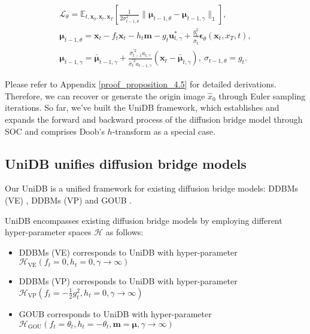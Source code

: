 \begin{equation}\label{objective_function}
\begin{gathered}
\mathcal{L}_{\theta} = \mathbb{E}_{t, \mathbf{x}_0, \mathbf{x}_t, \mathbf{x}_T} \left[ \frac{1}{2\sigma_{t-1, \theta}^2} \big \| \boldsymbol{\mu}_{t-1, \theta} - \boldsymbol{\mu}_{t-1, \gamma} \big \|_1 \right], \\
\boldsymbol{\mu}_{t-1, \theta} = \mathbf{x}_{t} - f_t \mathbf{x}_t - h_t \mathbf{m} - g_t \mathbf{u}_{t, \gamma}^{*} + \frac{g^2_t}{\bar{\sigma}_{t}^{\prime}} \boldsymbol{\epsilon}_{\theta}(\mathbf{x}_t, x_T, t), \\
\boldsymbol{\mu}_{t-1, \gamma} = \bar{\boldsymbol{\mu}}_{t-1, \gamma} + \frac{\bar{\sigma}_{t-1}^{\prime2}a_{t, \gamma}}{\bar{\sigma}_{t}^{\prime2}a_{t-1, \gamma} } (\mathbf{x}_t - \bar{\boldsymbol{\mu}}_{t, \gamma}),\ \sigma_{t-1, \theta} = g_t.
\end{gathered}
\end{equation}

Please refer to Appendix \ref{proof_proposition_4.5} for detailed derivations. Therefore, we can recover or generate the origin image $\hat{x}_0$ through Euler sampling iterations. So far, we've built the UniDB framework, which establishes and expands the forward and backward process of the diffusion bridge model through SOC and comprises Doob's $h$-transform as a special case. 


\subsection{UniDB unifies diffusion bridge models}
Our UniDB is a unified framework for existing diffusion bridge models: DDBMs (VE) \cite{zhou2023denoisingdiffusionbridgemodels}, DDBMs (VP) \cite{zhou2023denoisingdiffusionbridgemodels} and GOUB \cite{yue2024imagerestorationgeneralizedornsteinuhlenbeck}.  
\begin{proposition}\label{proposition_4.4} UniDB encompasses existing diffusion bridge models by employing different hyper-parameter spaces $\mathcal{H}$ as follows:
\begin{itemize}


\item DDBMs (VE) corresponds to UniDB with hyper-parameter $\mathcal{H}_\text{VE}(f_t=0, h_t=0, \gamma \rightarrow \infty)$


\item DDBMs (VP) corresponds to UniDB with hyper-parameter $\mathcal{H}_\text{VP}(f_t=-\frac{1}{2} g^2_t, h_t=0, \gamma \rightarrow \infty)$


\item GOUB corresponds to UniDB with hyper-parameter $\mathcal{H}_\text{GOU}(f_t=\theta_t, h_t=-\theta_t, \mathbf{m} = \boldsymbol{\mu}, \gamma \rightarrow \infty)$
\end{itemize}
\end{proposition}

